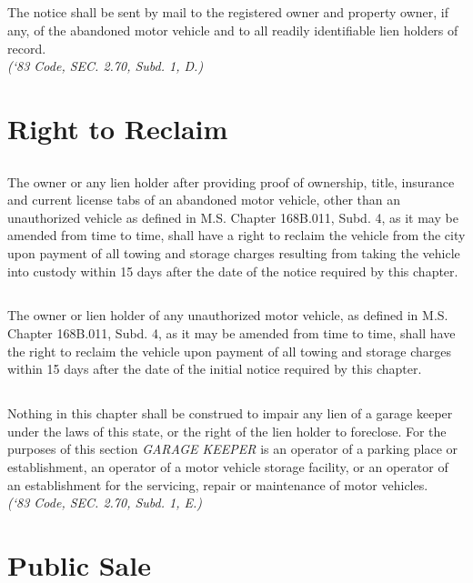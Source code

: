 \subsection{}
The notice shall be sent by mail to the registered owner and property owner, if any, of the abandoned motor vehicle and to all readily identifiable lien holders of record.\\
\emph{(‘83 Code, SEC. 2.70, Subd. 1, D.)}

\section{Right to Reclaim}
\subsection{}
The owner or any lien holder after providing proof of ownership, title, insurance and current license tabs of an abandoned motor vehicle, other than an unauthorized vehicle as defined in M.S. Chapter 168B.011, Subd. 4, as it may be amended from time to time, shall have a right to reclaim the vehicle from the city upon payment of all towing and storage charges resulting from taking the vehicle into custody within 15 days after the date of the notice required by this chapter.
\subsection{}
The owner or lien holder of any unauthorized motor vehicle, as defined in M.S. Chapter 168B.011, Subd. 4, as it may be amended from time to time, shall have the right to reclaim the vehicle upon payment of all towing and storage charges within 15 days after the date of the initial notice required by this chapter.
\subsection{}
Nothing in this chapter shall be construed to impair any lien of a garage keeper under the laws of this state, or the right of the lien holder to foreclose.  For the purposes of this section \emph{GARAGE KEEPER} is an operator of a parking place or establishment, an operator of a motor vehicle storage facility, or an operator of an establishment for the servicing, repair or maintenance of motor vehicles.\\
\emph{(‘83 Code, SEC. 2.70, Subd. 1, E.)}

\section{Public Sale}
